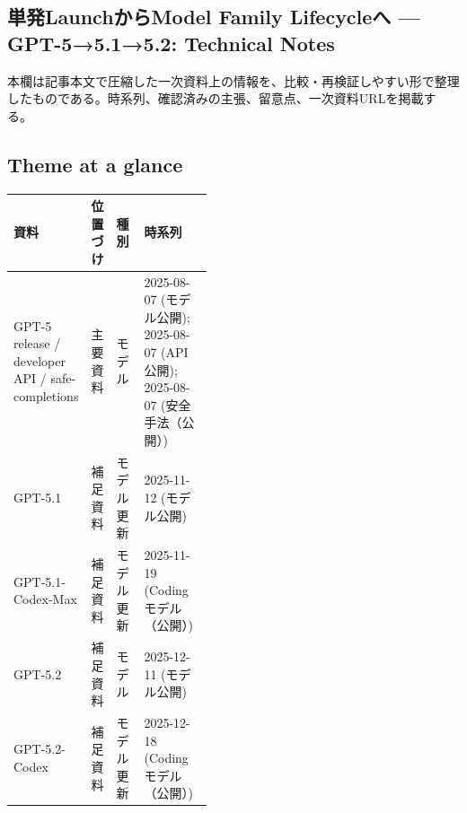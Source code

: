 \subsection*{単発LaunchからModel Family Lifecycleへ — GPT-5→5.1→5.2: Technical Notes}
本欄は記事本文で圧縮した一次資料上の情報を、比較・再検証しやすい形で整理したものである。時系列、確認済みの主張、留意点、一次資料URLを掲載する。
\medskip
\subsection*{Theme at a glance}
\begin{center}
\footnotesize
\begin{tabularx}{\linewidth}{@{}p{0.20\linewidth}p{0.10\linewidth}p{0.14\linewidth}X@{}}
\toprule
資料 & 位置づけ & 種別 & 時系列 \\
\midrule
GPT-5 release / developer API / safe-completions & 主要資料 & モデル & 2025-08-07 (モデル公開); 2025-08-07 (API公開); 2025-08-07 (安全手法（公開）)      \\
GPT-5.1 & 補足資料 & モデル更新 & 2025-11-12 (モデル公開)      \\
GPT-5.1-Codex-Max & 補足資料 & モデル更新 & 2025-11-19 (Codingモデル（公開）)      \\
GPT-5.2 & 補足資料 & モデル & 2025-12-11 (モデル公開)      \\
GPT-5.2-Codex & 補足資料 & モデル更新 & 2025-12-18 (Codingモデル（公開）)      \\
\bottomrule
\end{tabularx}
\end{center}
\normalsize

